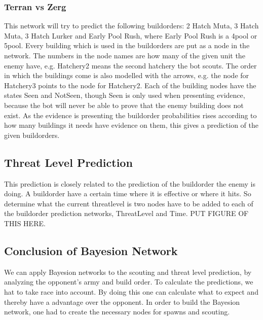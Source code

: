 
\subsubsection{Terran vs Zerg}
	This network will try to predict the following buildorders: 2 Hatch Muta, 3 Hatch Muta, 3 Hatch Lurker and Early Pool Rush, 
	where Early Pool Rush is a 4pool or 5pool. Every building which is used in the buildorders are put as a node in the network. 
	The numbers in the node names are how many of the given unit the enemy have, e.g. Hatchery2 means the second hatchery the bot scouts. 
	The order in which the buildings come is also modelled with the arrows, 
	e.g. the node for Hatchery3 points to the node for Hatchery2. Each of the building nodes have the states Seen and NotSeen, 
	though Seen is only used when presenting evidence, because the bot will never be able to prove that the 
	enemy building does not exist. As the evidence is presenting the buildorder 
	probabilities rises according to how many buildings it needs have evidence on them, this gives a prediction of the given buildorders.

\subsection{Threat Level Prediction}
	This prediction is closely related to the prediction of the buildorder the enemy is doing. A buildorder have a certain time where it is effective 
	or where it hits. So determine what the current threatlevel is two nodes have to be added to each of the buildorder prediction networks, ThreatLevel 
	and Time. PUT FIGURE OF THIS HERE.

\subsection{Conclusion of Bayesion Network}
	We can apply Bayesion networks to the scouting and threat level prediction, by analyzing the opponent's army and build order. To calculate the predictions, we hat to take race into account. By doing this one can calculate what to expect and
	thereby have a advantage over the opponent. In order to build the Bayesion network, one had to create the necessary nodes for spawns and scouting.
	












 